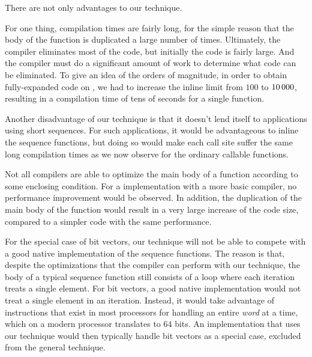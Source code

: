 There are not only advantages to our technique.

For one thing, compilation times are fairly long, for the simple
reason that the body of the function is duplicated a large number of
times.  Ultimately, the compiler eliminates most of the code, but
initially the code is fairly large.  And the compiler must do a
significant amount of work to determine what code can be eliminated.
To give an idea of the orders of magnitude, in order to obtain
fully-expanded code on \sbcl{}, we had to increase the inline limit from
$100$ to $10\thinspace000$, resulting in a compilation time of tens of
seconds for a single function.

Another disadvantage of our technique is that it doesn't lend itself
to applications using short sequences.  For such applications, it
would be advantageous to inline the sequence functions, but doing so
would make each call site suffer the same long compilation times as we
now observe for the ordinary callable functions.

Not all compilers are able to optimize the main body of a function
according to some enclosing condition.  For a \commonlisp{}
implementation with a more basic compiler, no performance improvement
would be observed.  In addition, the duplication of the main body of
the function would result in a very large increase of the code size,
compared to a simpler code with the same performance.

For the special case of bit vectors, our technique will not be able to
compete with a good native implementation of the sequence functions.
The reason is that, despite the optimizations that the compiler can
perform with our technique, the body of a typical sequence function
still consists of a loop where each iteration treats a single
element.  For bit vectors, a good native implementation would not
treat a single element in an iteration.  Instead, it would take
advantage of instructions that exist in most processors for handling
an entire \emph{word} at a time, which on a modern processor
translates to $64$ bits.  An implementation that uses our technique
would then typically handle bit vectors as a special case, excluded
from the general technique.
